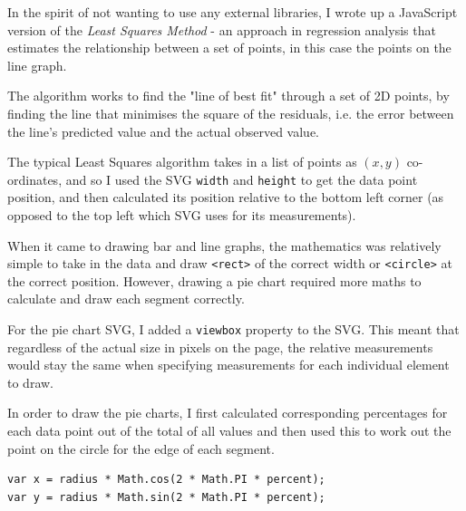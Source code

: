 \documentclass[ %
                    author={Aleena Baig},
                supervisor={Dr Simon Lock},
                    degree={BSc},
                     title={On Making Web Accessible Graphs},
                  subtitle={},
                      year={2019} ]{dissertation}
\begin{document}
In the spirit of not wanting to use any external libraries, I wrote up a JavaScript version of the \textit{Least Squares Method} -  an approach in regression analysis that estimates the relationship between a set of points, in this case the points on the line graph.

The algorithm works to find the "line of best fit" through a set of 2D points, by finding the line that minimises the square of the residuals, i.e. the error between the line's predicted value and the actual observed value.

The typical Least Squares algorithm takes in a list of points as $(x,y)$ co-ordinates, and so I used the SVG \texttt{width} and \texttt{height} to get the data point position, and then calculated its position relative to the bottom left corner (as opposed to the top left which SVG uses for its measurements).

When it came to drawing bar and line graphs, the mathematics was relatively simple to take in the data and draw \texttt{<rect>} of the correct width or \texttt{<circle>} at the correct position. However, drawing a pie chart required more maths to calculate and draw each segment correctly.

For the pie chart SVG, I added a \texttt{viewbox} property to the SVG. This meant that regardless of the actual size in pixels on the page, the relative measurements would stay the same when specifying measurements for each individual element to draw.

In order to draw the pie charts, I first calculated corresponding percentages for each data point out of the total of all values and then used this to work out the point on the circle for the edge of each segment.

\begin{lstlisting}
var x = radius * Math.cos(2 * Math.PI * percent);
var y = radius * Math.sin(2 * Math.PI * percent);
\end{lstlisting}
\end{document}
